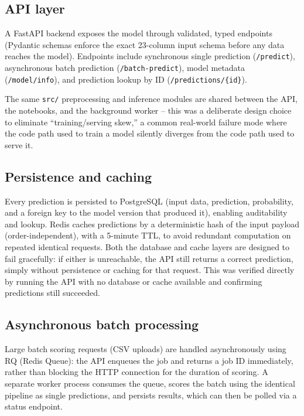 \documentclass[11pt]{article}
\begin{document}
\subsection{API layer}
A FastAPI backend exposes the model through validated, typed endpoints
(Pydantic schemas enforce the exact 23-column input schema before any
data reaches the model). Endpoints include synchronous single prediction
(\texttt{/predict}), asynchronous batch prediction
(\texttt{/batch-predict}), model metadata (\texttt{/model/info}), and
prediction lookup by ID (\texttt{/predictions/\{id\}}).

The same \texttt{src/} preprocessing and inference modules are shared
between the API, the notebooks, and the background worker -- this was a
deliberate design choice to eliminate ``training/serving skew,'' a common
real-world failure mode where the code path used to train a model
silently diverges from the code path used to serve it.

\subsection{Persistence and caching}
Every prediction is persisted to PostgreSQL (input data, prediction,
probability, and a foreign key to the model version that produced it),
enabling auditability and lookup. Redis caches predictions by a
deterministic hash of the input payload (order-independent), with a
5-minute TTL, to avoid redundant computation on repeated identical
requests. Both the database and cache layers are designed to fail
gracefully: if either is unreachable, the API still returns a correct
prediction, simply without persistence or caching for that request. This
was verified directly by running the API with no database or cache
available and confirming predictions still succeeded.

\subsection{Asynchronous batch processing}
Large batch scoring requests (CSV uploads) are handled asynchronously
using RQ (Redis Queue): the API enqueues the job and returns a job ID
immediately, rather than blocking the HTTP connection for the duration of
scoring. A separate worker process consumes the queue, scores the batch
using the identical pipeline as single predictions, and persists results,
which can then be polled via a status endpoint.
\end{document}
